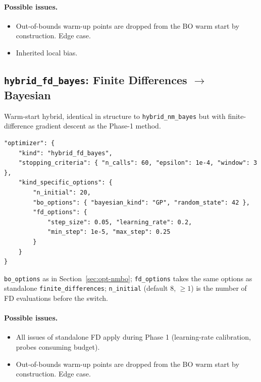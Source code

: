 \paragraph{Possible issues.}
\begin{itemize}
  \item Out-of-bounds warm-up points are dropped from the BO warm start by
        construction. Edge case.
  \item Inherited local bias.
\end{itemize}

\subsection{\texttt{hybrid\_fd\_bayes}: Finite Differences $\to$ Bayesian}
\label{sec:opt-fdbo}

Warm-start hybrid, identical in structure to \texttt{hybrid\_nm\_bayes} but
with finite-difference gradient descent as the Phase-1 method.

\begin{lstlisting}
"optimizer": {
    "kind": "hybrid_fd_bayes",
    "stopping_criteria": { "n_calls": 60, "epsilon": 1e-4, "window": 3 },
    "kind_specific_options": {
        "n_initial": 20,
        "bo_options": { "bayesian_kind": "GP", "random_state": 42 },
        "fd_options": {
            "step_size": 0.05, "learning_rate": 0.2,
            "min_step": 1e-5, "max_step": 0.25
        }
    }
}
\end{lstlisting}

\texttt{bo\_options} as in Section~\ref{sec:opt-nmbo};
\texttt{fd\_options} takes the same options as standalone
\texttt{finite\_differences}; \texttt{n\_initial} (default 8, $\geq 1$) is
the number of FD evaluations before the switch.

\paragraph{Possible issues.}
\begin{itemize}
  \item All issues of standalone FD apply during Phase 1 (learning-rate
        calibration, probes consuming budget).
  \item Out-of-bounds warm-up points are dropped from the BO warm start by
        construction. Edge case.
\end{itemize}

